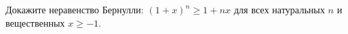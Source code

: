 Докажите неравенство Бернулли: $(1 + x)^n \ge 1 + nx$ для всех натуральных $n$ и вещественных $x \ge -1$.